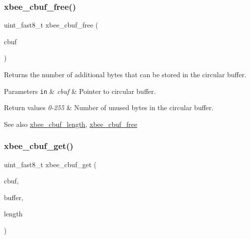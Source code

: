 \subsubsection{\texorpdfstring{xbee\+\_\+cbuf\+\_\+free()}{xbee\_cbuf\_free()}}
{\footnotesize\ttfamily uint\+\_\+fast8\+\_\+t xbee\+\_\+cbuf\+\_\+free (\begin{DoxyParamCaption}\item[{\hyperlink{structxbee__cbuf__t}{xbee\+\_\+cbuf\+\_\+t} \hyperlink{group__hal_gaef060b3456fdcc093a7210a762d5f2ed}{F\+AR} $\ast$}]{cbuf }\end{DoxyParamCaption})}



Returns the number of additional bytes that can be stored in the circular buffer. 


\begin{DoxyParams}[1]{Parameters}
\mbox{\tt in}  & {\em cbuf} & Pointer to circular buffer.\\
\hline
\end{DoxyParams}

\begin{DoxyRetVals}{Return values}
{\em 0-\/255} & Number of unused bytes in the circular buffer.\\
\hline
\end{DoxyRetVals}
\begin{DoxySeeAlso}{See also}
\hyperlink{group__util__cbuf_gaa3f9edea3274c2d62f09768c38fe6a1d}{xbee\+\_\+cbuf\+\_\+length}, \hyperlink{group__util__cbuf_ga9a2eeedf642bdf31dba98aacdc5a7d75}{xbee\+\_\+cbuf\+\_\+free} 
\end{DoxySeeAlso}
\mbox{\label{group__util__cbuf_ga98b2d80239319b2a9875772c28a7630a}} 
\subsubsection{\texorpdfstring{xbee\+\_\+cbuf\+\_\+get()}{xbee\_cbuf\_get()}}
{\footnotesize\ttfamily uint\+\_\+fast8\+\_\+t xbee\+\_\+cbuf\+\_\+get (\begin{DoxyParamCaption}\item[{\hyperlink{structxbee__cbuf__t}{xbee\+\_\+cbuf\+\_\+t} $\ast$}]{cbuf,  }\item[{void \hyperlink{group__hal_gaef060b3456fdcc093a7210a762d5f2ed}{F\+AR} $\ast$}]{buffer,  }\item[{uint\+\_\+fast8\+\_\+t}]{length }\end{DoxyParamCaption})}



